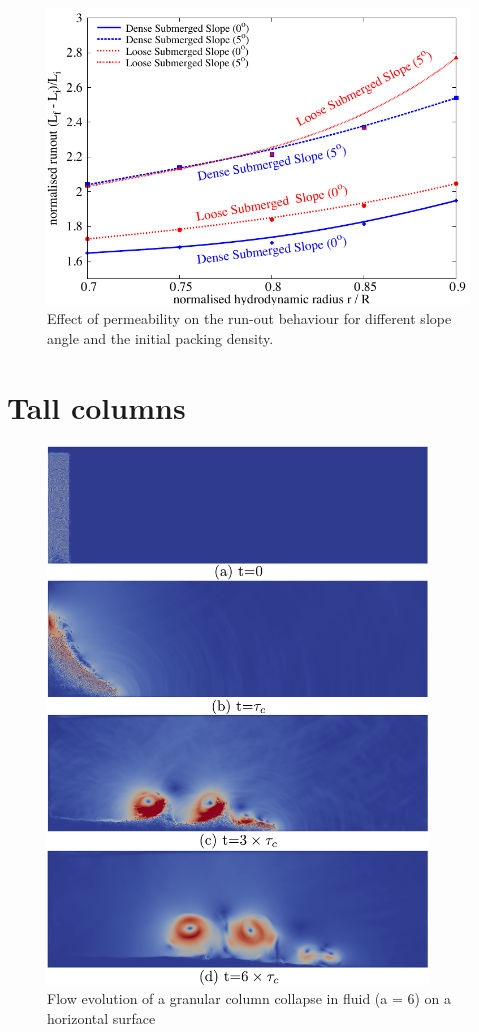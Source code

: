 \begin{figure}
\centering
\includegraphics[width=0.97\columnwidth]{Perm_Runout_slope}
\caption{Effect of permeability on the run-out behaviour for different slope 
angle and the initial packing density.}
\label{fig:Perm_Runout_slope}
\end{figure}

\clearpage

\section{Tall columns}

\begin{figure}[htpb]
\centering
\includegraphics[width=0.9\textwidth]{LBM_DEM_a6}
\caption{Flow evolution of a granular column collapse in fluid (a = 6) on a 
horizontal surface}
\label{fig:LBM_DEM_a6}
\end{figure}


